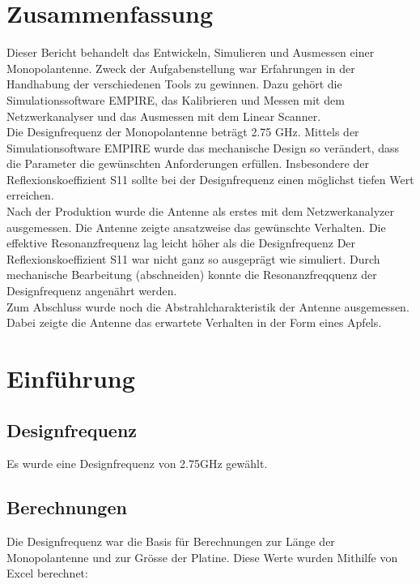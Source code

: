 

	\vspace*{15 mm}

\section{Zusammenfassung}

Dieser Bericht behandelt das Entwickeln, Simulieren und Ausmessen einer Monopolantenne. Zweck der Aufgabenstellung war Erfahrungen in der Handhabung der verschiedenen Tools zu gewinnen. Dazu gehört die Simulationssoftware EMPIRE, das Kalibrieren und Messen mit dem Netzwerkanalyser und das Ausmessen mit dem Linear Scanner.\\
Die Designfrequenz der Monopolantenne beträgt 2.75 GHz. Mittels der Simulationsoftware EMPIRE wurde das mechanische Design so verändert, dass die Parameter die gewünschten Anforderungen erfüllen. Insbesondere der Reflexionskoeffizient S11 sollte bei der Designfrequenz einen möglichst tiefen Wert erreichen.\\
Nach der Produktion wurde die Antenne als erstes mit dem Netzwerkanalyzer ausgemessen. Die Antenne zeigte ansatzweise das gewünschte Verhalten. Die effektive Resonanzfrequenz lag leicht höher als die Designfrequenz Der Reflexionskoeffizient S11 war nicht ganz so ausgeprägt wie simuliert. Durch mechanische Bearbeitung (abschneiden) konnte die Resonanzfreqquenz der Designfrequenz angenährt werden.\\
Zum Abschluss wurde noch die Abstrahlcharakteristik der Antenne ausgemessen. Dabei zeigte die Antenne das erwartete Verhalten in der Form eines Apfels.

\newpage

\section{Einführung}



\subsection{Designfrequenz}
Es wurde eine Designfrequenz von 2.75GHz gewählt.\\

\subsection{Berechnungen}
Die Designfrequenz war die Basis für Berechnungen zur Länge der Monopolantenne und zur Grösse der Platine. Diese Werte wurden Mithilfe von Excel berechnet:
\vspace{3mm}

